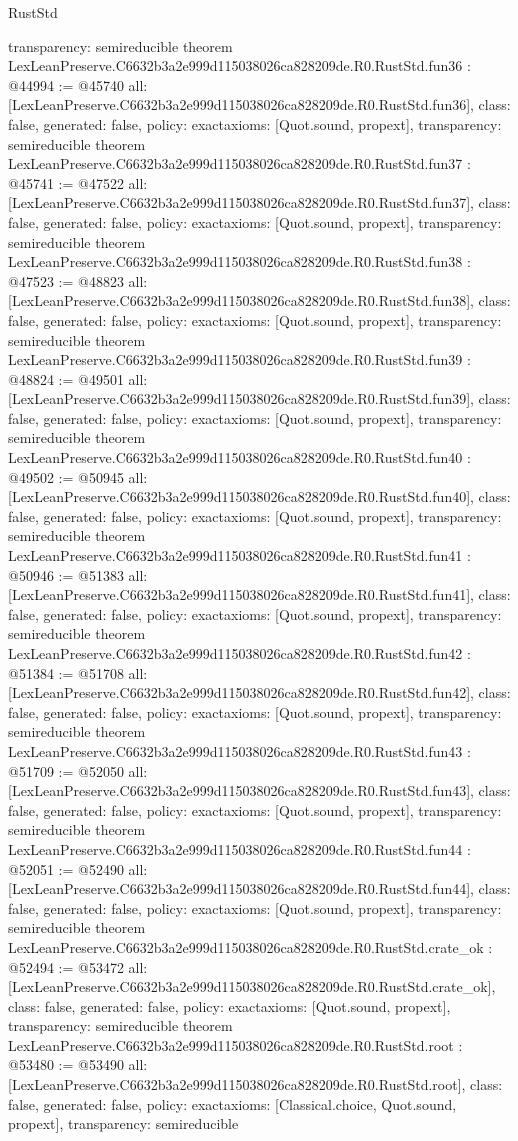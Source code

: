 \begin{lexlean}{RustStd}
\begin{coremodule}
{  transparency: semireducible
}
theorem LexLeanPreserve.C6632b3a2e999d115038026ca828209de.R0.RustStd.fun36 : @44994 := @45740 {
  all: [LexLeanPreserve.C6632b3a2e999d115038026ca828209de.R0.RustStd.fun36],
  class: false,
  generated: false,
  policy: exact{axioms: [Quot.sound, propext]},
  transparency: semireducible
}
theorem LexLeanPreserve.C6632b3a2e999d115038026ca828209de.R0.RustStd.fun37 : @45741 := @47522 {
  all: [LexLeanPreserve.C6632b3a2e999d115038026ca828209de.R0.RustStd.fun37],
  class: false,
  generated: false,
  policy: exact{axioms: [Quot.sound, propext]},
  transparency: semireducible
}
theorem LexLeanPreserve.C6632b3a2e999d115038026ca828209de.R0.RustStd.fun38 : @47523 := @48823 {
  all: [LexLeanPreserve.C6632b3a2e999d115038026ca828209de.R0.RustStd.fun38],
  class: false,
  generated: false,
  policy: exact{axioms: [Quot.sound, propext]},
  transparency: semireducible
}
theorem LexLeanPreserve.C6632b3a2e999d115038026ca828209de.R0.RustStd.fun39 : @48824 := @49501 {
  all: [LexLeanPreserve.C6632b3a2e999d115038026ca828209de.R0.RustStd.fun39],
  class: false,
  generated: false,
  policy: exact{axioms: [Quot.sound, propext]},
  transparency: semireducible
}
theorem LexLeanPreserve.C6632b3a2e999d115038026ca828209de.R0.RustStd.fun40 : @49502 := @50945 {
  all: [LexLeanPreserve.C6632b3a2e999d115038026ca828209de.R0.RustStd.fun40],
  class: false,
  generated: false,
  policy: exact{axioms: [Quot.sound, propext]},
  transparency: semireducible
}
theorem LexLeanPreserve.C6632b3a2e999d115038026ca828209de.R0.RustStd.fun41 : @50946 := @51383 {
  all: [LexLeanPreserve.C6632b3a2e999d115038026ca828209de.R0.RustStd.fun41],
  class: false,
  generated: false,
  policy: exact{axioms: [Quot.sound, propext]},
  transparency: semireducible
}
theorem LexLeanPreserve.C6632b3a2e999d115038026ca828209de.R0.RustStd.fun42 : @51384 := @51708 {
  all: [LexLeanPreserve.C6632b3a2e999d115038026ca828209de.R0.RustStd.fun42],
  class: false,
  generated: false,
  policy: exact{axioms: [Quot.sound, propext]},
  transparency: semireducible
}
theorem LexLeanPreserve.C6632b3a2e999d115038026ca828209de.R0.RustStd.fun43 : @51709 := @52050 {
  all: [LexLeanPreserve.C6632b3a2e999d115038026ca828209de.R0.RustStd.fun43],
  class: false,
  generated: false,
  policy: exact{axioms: [Quot.sound, propext]},
  transparency: semireducible
}
theorem LexLeanPreserve.C6632b3a2e999d115038026ca828209de.R0.RustStd.fun44 : @52051 := @52490 {
  all: [LexLeanPreserve.C6632b3a2e999d115038026ca828209de.R0.RustStd.fun44],
  class: false,
  generated: false,
  policy: exact{axioms: [Quot.sound, propext]},
  transparency: semireducible
}
theorem LexLeanPreserve.C6632b3a2e999d115038026ca828209de.R0.RustStd.crate_ok : @52494 := @53472 {
  all: [LexLeanPreserve.C6632b3a2e999d115038026ca828209de.R0.RustStd.crate_ok],
  class: false,
  generated: false,
  policy: exact{axioms: [Quot.sound, propext]},
  transparency: semireducible
}
theorem LexLeanPreserve.C6632b3a2e999d115038026ca828209de.R0.RustStd.root : @53480 := @53490 {
  all: [LexLeanPreserve.C6632b3a2e999d115038026ca828209de.R0.RustStd.root],
  class: false,
  generated: false,
  policy: exact{axioms: [Classical.choice, Quot.sound, propext]},
  transparency: semireducible
}


\end{coremodule}
\end{lexlean}
